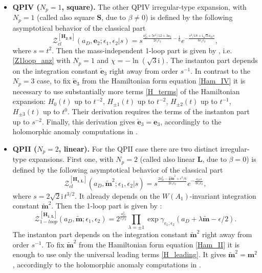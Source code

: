 \documentclass[12pt,a4paper]{article}
\numberwithin{equation}{section}
\newcommand{\ri}{\mathrm{i}}
\newcommand{\D}{\scriptscriptstyle{D}}
\begin{document}
\begin{itemize}
    \item {\bf QPIV ($N_p=1$, square).}
    The other QPIV irregular-type expansion, with $N_p=1$ (called also square $\mathbf{S}$, due to $\beta\neq0$) is defined by the following asymptotical behavior of the classical part \cite[(4.97)]{BST25}
    \begin{equation}
    \mathcal{Z}_{cl}^{[\mathbf{H_{2,S}}]}(a_{\D},\boldsymbol{e}_2;\epsilon_1,\epsilon_2|s)= s^{\frac{a_{\D}^2+5\epsilon^2/12+3\boldsymbol{e}_2}{2\epsilon_1\epsilon_2}-\frac16}e^{-\frac{s^2/18+\ri \sqrt3 a_{\D} s}{6\epsilon_1\epsilon_2}}, 
    \end{equation}
    where $s=t^2$.
    Then the mass-independent 1-loop part is given by \cite[(4.107)]{BST25}, i.e. \eqref{Z1loop_anz} with $N_p=1$ and $\chi=-\ln(\sqrt3 \ri)$. The instanton part \cite[(4.102)]{BST25} depends on the integration constant $\check{\boldsymbol{e}}_3$ right away from order $s^{-1}$. In contrast to the $N_p=3$ case, to fix $\check{\boldsymbol{e}}_3$ from the Hamiltonian form equation \eqref{Ham_IV} it is necessary to use substantially more terms \eqref{H_terms} of the Hamiltonian expansion: $H_0(t)$ up to $t^{-2}$, $H_{\pm1}(t)$ up to $t^{-2}$, $H_{\pm2}(t)$ up to $t^{-1}$, $H_{\pm3}(t)$ up to $t^0$. Their derivation requires the terms of the instanton part up to $s^{-2}$. 
    Finally, this derivation gives $\check{\boldsymbol{e}}_3=\boldsymbol{e}_3$,  accordingly to the holomorphic anomaly computations in \cite[Sec. 5.5]{BST25}.
    
    \item {\bf QPII ($N_p=2$, linear).} 
    For the QPII case there are two distinct irregular-type expansions. First one, with $N_p=2$ (called also linear $\mathbf{L}$, due to $\beta=0$) is defined by the following asymptotical behavior of the classical part \cite[(4.111)]{BST25}
    \begin{equation}
\mathcal{Z}^{[\mathbf{H_{1,L}}]}_{cl}(a_{\D},\tilde{\boldsymbol{m}}^2;\epsilon_1,\epsilon_2|s)=s^{\frac{2a_{\D}^2-\frac23\tilde{\boldsymbol{m}}^2+\epsilon^2/6}{2\epsilon_1\epsilon_2}}e^{-\frac{a_{\D}s}{3\epsilon_1\epsilon_2}},
    \end{equation}
    where $s=2\sqrt2\ri\,t^{3/2}$.
    It already depends on the $W(A_1)$-invariant integration constant $\tilde{\boldsymbol{m}}^2$. Then the 1-loop part is given by \cite[(4.117)]{BST25}:
\begin{equation}\label{Z1loop_H1L}
\mathcal{Z}_{1-loop}^{[\mathbf{H_{1,L}}]}(a_{\D},\tilde{\boldsymbol{m}};\epsilon_1,\epsilon_2)= 2^{\frac{a_{\D}^2}{\epsilon_1\epsilon_2}}\prod\limits_{\lambda=\pm1}  \exp \gamma_{\epsilon_1,\epsilon_2} \left(a_{\D}+\lambda\tilde{\boldsymbol{m}}-\epsilon/2\right). 
\end{equation}
The instanton part \cite[(4.113)]{BST25} depends on the integration constant $\tilde{\boldsymbol{m}}^2$ right away from order $s^{-1}$.
To fix $\tilde{\boldsymbol{m}}^2$ from the Hamiltonian form equation \eqref{Ham_II} it is enough to use only the universal leading terms \eqref{H_leading}. It gives $\tilde{\boldsymbol{m}}^2=\boldsymbol{m}^2$,  accordingly to the holomorphic anomaly computations in \cite[Sec. 5.6]{BST25}.
    

\end{itemize}
\end{document}
